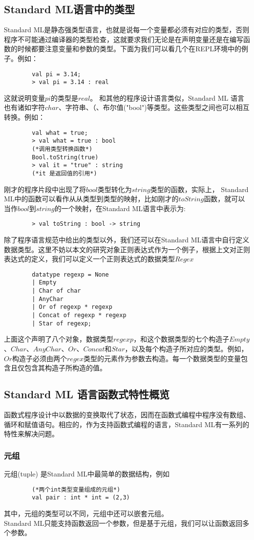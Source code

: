 \documentclass[openany,oneside]{book}
\theoremstyle{definition}
\theoremstyle{definition}
\begin{document}
\subsection{Standard ML语言中的类型}
	Standard ML是静态强类型语言，也就是说每一个变量都必须有对应的类型，否则程序不可能通过编译器的类型检查，这就要求我们无论是在声明变量还是在编写函数的时候都要注意变量和参数的类型。下面为我们可以看几个在REPL环境中的例子。例如：
	\begin{lstlisting}
		val pi = 3.14;
		> val pi = 3.14 : real
	\end{lstlisting}
	这就说明变量\(pi\)的类型是\(real\)。
	和其他的程序设计语言类似，Standard ML 语言也有诸如字符\(char\)、字符串、（、布尔值("bool")等类型。这些类型之间也可以相互转换。例如：
	\begin{lstlisting}
		val what = true;
		> val what = true : bool
		(*调用类型转换函数*)
		Bool.toString(true)
		> val it = "true" : string
		(*it 是返回值的引用*)
	\end{lstlisting}
	刚才的程序片段中出现了将\(bool\)类型转化为\(string\)类型的函数，实际上， Standard ML中的函数可以看作从从类型到类型的映射，比如刚才的\(toString\)函数，就可以当作\(bool\)到\(string\)的一个映射，在Standard ML语言中表示为:
	\begin{lstlisting}
		> val toString : bool -> string
	\end{lstlisting}
	除了程序语言规范中给出的类型以外，我们还可以在Standard ML语言中自行定义数据类型。\cite{paulson1996ml-124}这里不妨以本文的研究对象正则表达式作为一个例子，根据上文对正则表达式的定义，我们可以定义一个正则表达式的数据类型\(Regex\)
	\begin{lstlisting}
		datatype regexp = None
		| Empty
		| Char of char
		| AnyChar
		| Or of regexp * regexp
		| Concat of regexp * regexp
		| Star of regexp;
	\end{lstlisting}
	上面这个声明了八个对象，数据类型\(regexp\)，和这个数据类型的七个构造子\(Empty\)、\(Char\)、\(AnyChar\)、\(Or\)、\(Concat\)和\(Star\)，以及每个构造子所对应的类型。例如，\(Or\)构造子必须由两个\(regex\)类型的元素作为参数去构造。每一个数据类型的变量包含且仅包含其构造子所构造的值。
\subsection{Standard ML 语言函数式特性概览}
	函数式程序设计中以数据的变换取代了状态，因而在函数式编程中程序没有数组、循环和赋值语句。相应的，作为支持函数式编程的语言，Standard ML有一系列的特性来解决问题。\\
	\subsubsection*{元组}
	\indent 元组(tuple) 是Standard ML中最简单的数据结构，例如
	\begin{lstlisting}
		(*两个int类型变量组成的元组*)
		val pair : int * int = (2,3)
	\end{lstlisting}
	其中，元组的类型可以不同，元组中还可以嵌套元组。\\
	\indent Standard ML只能支持函数返回一个参数，但是基于元组，我们可以让函数返回多个参数。
\end{document}
